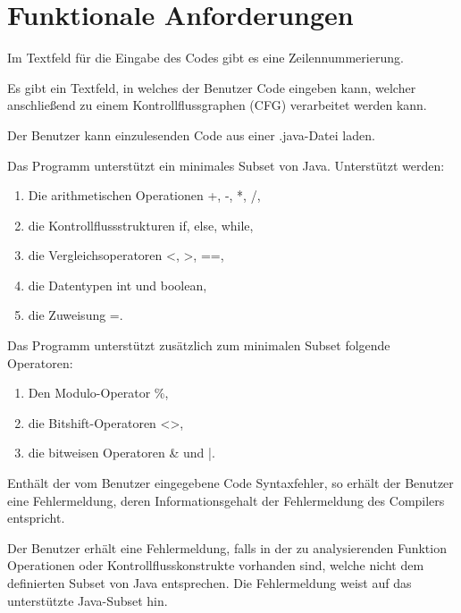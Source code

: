 
\section{Funktionale Anforderungen}

Im Textfeld für die Eingabe des Codes gibt es eine Zeilennummerierung.

Es gibt ein Textfeld, in welches der Benutzer Code eingeben kann, welcher anschließend zu einem Kontrollflussgraphen (CFG) verarbeitet werden kann.

Der Benutzer kann einzulesenden Code aus einer .java-Datei laden.

Das Programm unterstützt ein minimales Subset von Java.
Unterstützt werden:
\begin{enumerate}[label=(\alph*)]
\item Die arithmetischen Operationen +, -, *, /,
\item die Kontrollflussstrukturen if, else, while,
\item die Vergleichsoperatoren <, >, ==,
\item die Datentypen int und boolean,
\item die Zuweisung =.
\end{enumerate}

Das Programm unterstützt zusätzlich zum minimalen Subset folgende Operatoren:
\begin{enumerate}[label=(\alph*)]
\item Den Modulo-Operator \%,
\item die Bitshift-Operatoren <\null>,
\item die bitweisen Operatoren \& und |.
\end{enumerate}

Enthält der vom Benutzer eingegebene Code Syntaxfehler, so erhält der Benutzer eine Fehlermeldung, deren Informationsgehalt der Fehlermeldung des Compilers entspricht.

Der Benutzer erhält eine Fehlermeldung, falls in der zu analysierenden Funktion Operationen oder Kontrollflusskonstrukte vorhanden sind, welche nicht dem definierten Subset von Java entsprechen. Die Fehlermeldung weist auf das unterstützte Java-Subset hin.

